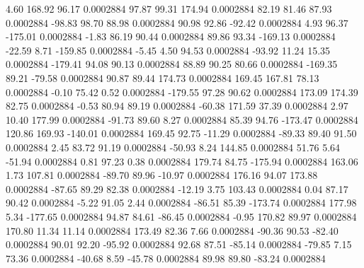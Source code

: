         4.60      168.92       96.17     0.0002884
       97.87       99.31      174.94     0.0002884
       82.19       81.46       87.93     0.0002884
      -98.83       98.70       88.98     0.0002884
       90.98       92.86      -92.42     0.0002884
        4.93       96.37     -175.01     0.0002884
       -1.83       86.19       90.44     0.0002884
       89.86       93.34     -169.13     0.0002884
      -22.59        8.71     -159.85     0.0002884
       -5.45        4.50       94.53     0.0002884
      -93.92       11.24       15.35     0.0002884
     -179.41       94.08       90.13     0.0002884
       88.89       90.25       80.66     0.0002884
     -169.35       89.21      -79.58     0.0002884
       90.87       89.44      174.73     0.0002884
      169.45      167.81       78.13     0.0002884
       -0.10       75.42        0.52     0.0002884
     -179.55       97.28       90.62     0.0002884
      173.09      174.39       82.75     0.0002884
       -0.53       80.94       89.19     0.0002884
      -60.38      171.59       37.39     0.0002884
        2.97       10.40      177.99     0.0002884
      -91.73       89.60        8.27     0.0002884
       85.39       94.76     -173.47     0.0002884
      120.86      169.93     -140.01     0.0002884
      169.45       92.75      -11.29     0.0002884
      -89.33       89.40       91.50     0.0002884
        2.45       83.72       91.19     0.0002884
      -50.93        8.24      144.85     0.0002884
       51.76        5.64      -51.94     0.0002884
        0.81       97.23        0.38     0.0002884
      179.74       84.75     -175.94     0.0002884
      163.06        1.73      107.81     0.0002884
      -89.70       89.96      -10.97     0.0002884
      176.16       94.07      173.88     0.0002884
      -87.65       89.29       82.38     0.0002884
      -12.19        3.75      103.43     0.0002884
        0.04       87.17       90.42     0.0002884
       -5.22       91.05        2.44     0.0002884
      -86.51       85.39     -173.74     0.0002884
      177.98        5.34     -177.65     0.0002884
       94.87       84.61      -86.45     0.0002884
       -0.95      170.82       89.97     0.0002884
      170.80       11.34       11.14     0.0002884
      173.49       82.36        7.66     0.0002884
      -90.36       90.53      -82.40     0.0002884
       90.01       92.20      -95.92     0.0002884
       92.68       87.51      -85.14     0.0002884
      -79.85        7.15       73.36     0.0002884
      -40.68        8.59      -45.78     0.0002884
       89.98       89.80      -83.24     0.0002884
